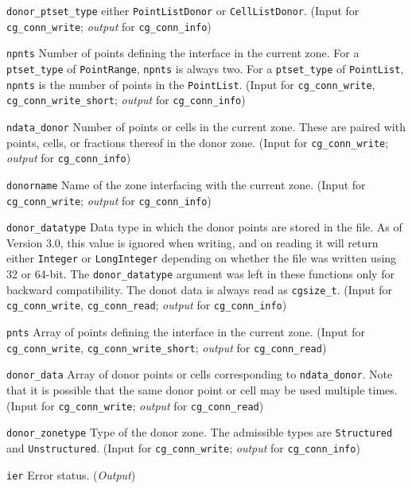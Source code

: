 \begin{Ventryi}{\texttt{donor\_ptset\_type}}
      either \texttt{PointListDonor} or \texttt{CellListDonor}.
      (\textcolor{input}{Input} for \texttt{cg\_conn\_write};
      \textcolor{output}{\textit{output}} for \texttt{cg\_conn\_info})
\item [\texttt{npnts}]
      Number of points defining the interface in the current zone.
      For a \texttt{ptset\_type} of \texttt{PointRange}, \texttt{npnts}
      is always two.
      For a \texttt{ptset\_type} of \texttt{PointList}, \texttt{npnts} is
      the number of points in the \texttt{PointList}.
      (\textcolor{input}{Input} for \texttt{cg\_conn\_write},
      \texttt{cg\_conn\_write\_short};
      \textcolor{output}{\textit{output}} for \texttt{cg\_conn\_info})
\item [\texttt{ndata\_donor}]
      Number of points or cells in the current zone.
      These are paired with points, cells, or fractions thereof in the
      donor zone.
      (\textcolor{input}{Input} for \texttt{cg\_conn\_write};
      \textcolor{output}{\textit{output}} for \texttt{cg\_conn\_info})
\item [\texttt{donorname}]
      Name of the zone interfacing with the current zone.
      (\textcolor{input}{Input} for \texttt{cg\_conn\_write};
      \textcolor{output}{\textit{output}} for \texttt{cg\_conn\_info})
\item [\texttt{donor\_datatype}]
      Data type in which the donor points are stored in the file.
      As of Version 3.0, this value is ignored when writing, and on
      reading it will return either \texttt{Integer} or \texttt{LongInteger}
      depending on whether the file was written using 32 or 64-bit.
      The \texttt{donor\_datatype} argument was left in these functions
      only for backward compatibility. The donot data is always read
      as \texttt{cgsize\_t}.
      (\textcolor{input}{Input} for \texttt{cg\_conn\_write},
      \texttt{cg\_conn\_read};
      \textcolor{output}{\textit{output}} for \texttt{cg\_conn\_info})
\item [\texttt{pnts}]
      Array of points defining the interface in the current zone.
      (\textcolor{input}{Input} for \texttt{cg\_conn\_write},
      \texttt{cg\_conn\_write\_short};
      \textcolor{output}{\textit{output}} for \texttt{cg\_conn\_read})
\item [\texttt{donor\_data}]
      Array of donor points or cells corresponding to
      \texttt{ndata\_donor}.
      Note that it is possible that the same donor point or cell may
      be used multiple times.
      (\textcolor{input}{Input} for \texttt{cg\_conn\_write};
      \textcolor{output}{\textit{output}} for \texttt{cg\_conn\_read})
\item [\texttt{donor\_zonetype}]
      Type of the donor zone.
      The admissible types are \texttt{Structured} and \texttt{Unstructured}.
      (\textcolor{input}{Input} for \texttt{cg\_conn\_write};
      \textcolor{output}{\textit{output}} for \texttt{cg\_conn\_info})
\item [\texttt{ier}]
      Error status.
      (\textcolor{output}{\textit{Output}})
\end{Ventryi}

